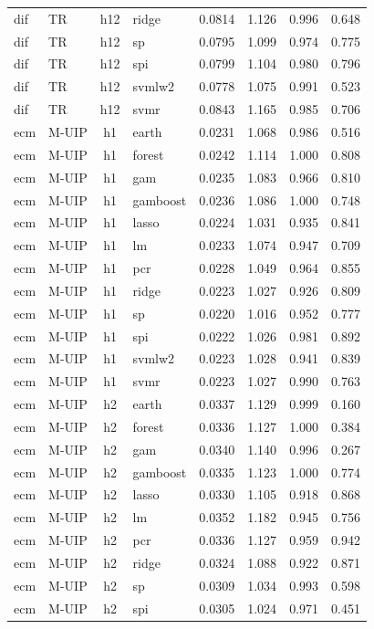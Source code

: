 \begin{ThreePartTable}
\begin{longtable}[t]{llclcccc}
dif & TR & h12 & ridge & 0.0814 & 1.126 & 0.996 & 0.648\\
dif & TR & h12 & sp & 0.0795 & 1.099 & 0.974 & 0.775\\
dif & TR & h12 & spi & 0.0799 & 1.104 & 0.980 & 0.796\\
dif & TR & h12 & svmlw2 & 0.0778 & 1.075 & 0.991 & 0.523\\
dif & TR & h12 & svmr & 0.0843 & 1.165 & 0.985 & 0.706\\
\addlinespace
ecm & M-UIP & h1 & earth & 0.0231 & 1.068 & 0.986 & 0.516\\
ecm & M-UIP & h1 & forest & 0.0242 & 1.114 & 1.000 & 0.808\\
ecm & M-UIP & h1 & gam & 0.0235 & 1.083 & 0.966 & 0.810\\
ecm & M-UIP & h1 & gamboost & 0.0236 & 1.086 & 1.000 & 0.748\\
ecm & M-UIP & h1 & lasso & 0.0224 & 1.031 & 0.935 & 0.841\\
ecm & M-UIP & h1 & lm & 0.0233 & 1.074 & 0.947 & 0.709\\
ecm & M-UIP & h1 & pcr & 0.0228 & 1.049 & 0.964 & 0.855\\
ecm & M-UIP & h1 & ridge & 0.0223 & 1.027 & 0.926 & 0.809\\
ecm & M-UIP & h1 & sp & 0.0220 & 1.016 & 0.952 & 0.777\\
ecm & M-UIP & h1 & spi & 0.0222 & 1.026 & 0.981 & 0.892\\
ecm & M-UIP & h1 & svmlw2 & 0.0223 & 1.028 & 0.941 & 0.839\\
ecm & M-UIP & h1 & svmr & 0.0223 & 1.027 & 0.990 & 0.763\\
\addlinespace
ecm & M-UIP & h2 & earth & 0.0337 & 1.129 & 0.999 & 0.160\\
ecm & M-UIP & h2 & forest & 0.0336 & 1.127 & 1.000 & 0.384\\
ecm & M-UIP & h2 & gam & 0.0340 & 1.140 & 0.996 & 0.267\\
ecm & M-UIP & h2 & gamboost & 0.0335 & 1.123 & 1.000 & 0.774\\
ecm & M-UIP & h2 & lasso & 0.0330 & 1.105 & 0.918 & 0.868\\
ecm & M-UIP & h2 & lm & 0.0352 & 1.182 & 0.945 & 0.756\\
ecm & M-UIP & h2 & pcr & 0.0336 & 1.127 & 0.959 & 0.942\\
ecm & M-UIP & h2 & ridge & 0.0324 & 1.088 & 0.922 & 0.871\\
ecm & M-UIP & h2 & sp & 0.0309 & 1.034 & 0.993 & 0.598\\
ecm & M-UIP & h2 & spi & 0.0305 & 1.024 & 0.971 & 0.451\\

\end{longtable}
\end{ThreePartTable}
